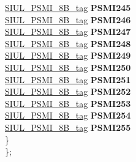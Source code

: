 \begin{DoxyCompactItemize}
\begin{tabbing}
\>\>\mbox{\hyperlink{unionSIUL__PSMI__8B__tag}{SIUL\_PSMI\_8B\_tag}} {\bfseries PSMI245}\\
\>\>\mbox{\hyperlink{unionSIUL__PSMI__8B__tag}{SIUL\_PSMI\_8B\_tag}} {\bfseries PSMI246}\\
\>\>\mbox{\hyperlink{unionSIUL__PSMI__8B__tag}{SIUL\_PSMI\_8B\_tag}} {\bfseries PSMI247}\\
\>\>\mbox{\hyperlink{unionSIUL__PSMI__8B__tag}{SIUL\_PSMI\_8B\_tag}} {\bfseries PSMI248}\\
\>\>\mbox{\hyperlink{unionSIUL__PSMI__8B__tag}{SIUL\_PSMI\_8B\_tag}} {\bfseries PSMI249}\\
\>\>\mbox{\hyperlink{unionSIUL__PSMI__8B__tag}{SIUL\_PSMI\_8B\_tag}} {\bfseries PSMI250}\\
\>\>\mbox{\hyperlink{unionSIUL__PSMI__8B__tag}{SIUL\_PSMI\_8B\_tag}} {\bfseries PSMI251}\\
\>\>\mbox{\hyperlink{unionSIUL__PSMI__8B__tag}{SIUL\_PSMI\_8B\_tag}} {\bfseries PSMI252}\\
\>\>\mbox{\hyperlink{unionSIUL__PSMI__8B__tag}{SIUL\_PSMI\_8B\_tag}} {\bfseries PSMI253}\\
\>\>\mbox{\hyperlink{unionSIUL__PSMI__8B__tag}{SIUL\_PSMI\_8B\_tag}} {\bfseries PSMI254}\\
\>\>\mbox{\hyperlink{unionSIUL__PSMI__8B__tag}{SIUL\_PSMI\_8B\_tag}} {\bfseries PSMI255}\\
\>\} \\
\}; \\


\end{tabbing}
\end{DoxyCompactItemize}
